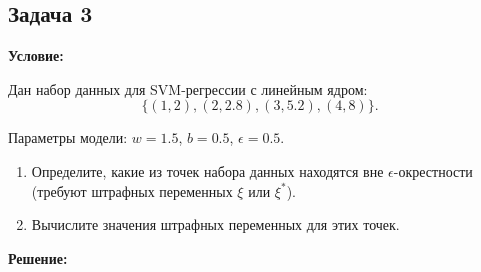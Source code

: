 \subsection{Задача 3}
\textbf{Условие:}
\par Дан набор данных для SVM-регрессии с линейным ядром:
\begin{equation*}
    \{(1, 2), (2, 2.8), (3, 5.2), (4, 8)\}.
\end{equation*}
\par Параметры модели: \(w = 1.5\), \(b = 0.5\), \(\epsilon = 0.5\).
\begin{enumerate}
    \item Определите, какие из точек набора данных находятся вне \(\epsilon\)-окрестности (требуют штрафных переменных \(\xi\) или \(\xi^*\)).
    \item Вычислите значения штрафных переменных для этих точек.
\end{enumerate}
\par \noindent \textbf{Решение:}
